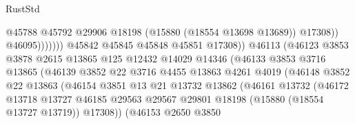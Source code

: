 \begin{lexlean}{RustStd}
\begin{coremodule}
                                                  @45788
                                                  @45792
                                                  @29906
                                                  @18198
                                                  (@15880 (@18554 @13698 @13689))
                                                  @17308))
                                              @46095)))))))
                                @45842
                                @45845
                                @45848
                                @45851
                                @17308))
                            @46113
                            (@46123
                              @3853
                              @3878
                              @2615
                              @13865
                              @125
                              @12432
                              @14029
                              @14346
                              (@46133
                                @3853
                                @3716
                                @13865
                                (@46139
                                  @3852
                                  @22
                                  @3716
                                  @4455
                                  @13863
                                  @4261
                                  @4019
                                  (@46148
                                    @3852
                                    @22
                                    @13863
                                    (@46154
                                      @3851
                                      @13
                                      @21
                                      @13732
                                      @13862
                                      (@46161
                                        @13732
                                        (@46172
                                          @13718
                                          @13727
                                          @46185
                                          @29563
                                          @29567
                                          @29801
                                          @18198
                                          (@15880 (@18554 @13727 @13719))
                                          @17308))
                                      (@46153
                                        @2650
                                        @3850

\end{coremodule}
\end{lexlean}
